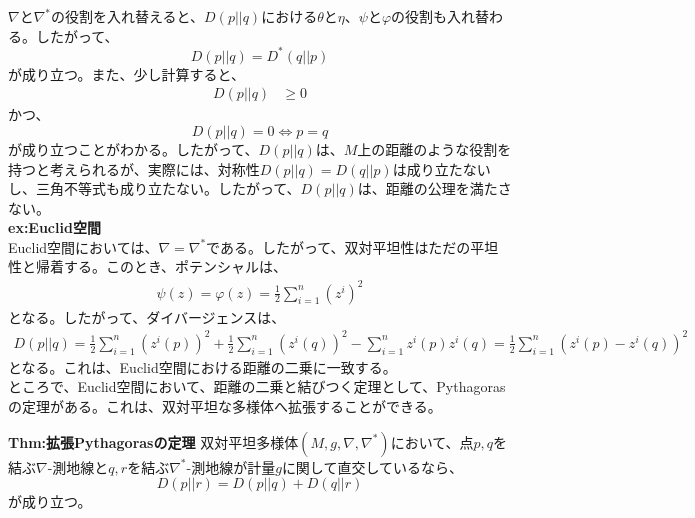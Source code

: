 \documentclass[a4paper,11pt]{jsarticle}
\numberwithin{equation}{section}
\begin{document}
    $\nabla$と$\nabla^*$の役割を入れ替えると、$D(p||q)$における$\theta$と$\eta$、$\psi$と$\varphi$の役割も入れ替わる。したがって、
    \begin{equation}
        D(p||q) = D^*(q||p)
    \end{equation}
    が成り立つ。また、少し計算すると、
    \begin{align}
        D(p||q) 
        &\geq 0
    \end{align}
    かつ、
    \begin{equation}
        D(p||q) = 0 \Leftrightarrow p = q 
    \end{equation}
    が成り立つことがわかる。したがって、$D(p||q)$は、$M$上の距離のような役割を持つと考えられるが、実際には、対称性$D(p||q) = D(q||p)$は成り立たないし、三角不等式も成り立たない。したがって、$D(p||q)$は、距離の公理を満たさない。\\
    
    \textbf{ex:Euclid空間}\\
    Euclid空間においては、$\nabla = \nabla^*$である。したがって、双対平坦性はただの平坦性と帰着する。このとき、ポテンシャルは、
    \begin{align}
        \psi(z) = \varphi(z) = \frac{1}{2}\sum_{i=1}^{n} (z^i)^2
    \end{align}
    となる。したがって、ダイバージェンスは、
    \begin{align}
        D(p||q) = \frac{1}{2}\sum_{i=1}^{n} (z^i(p))^2 + \frac{1}{2}\sum_{i=1}^{n} (z^i(q))^2 - \sum_{i=1}^{n} z^i(p)z^i(q) = \frac{1}{2}\sum_{i=1}^{n} (z^i(p) - z^i(q))^2
    \end{align}
    となる。これは、Euclid空間における距離の二乗に一致する。\\
    ところで、Euclid空間において、距離の二乗と結びつく定理として、Pythagorasの定理がある。これは、双対平坦な多様体へ拡張することができる。
    
    \begin{itembox}[l]{\textbf{Thm:拡張Pythagorasの定理}}
        双対平坦多様体$(M,g,\nabla,\nabla^*)$において、点$p,q$を結ぶ$\nabla$-測地線と$q,r$を結ぶ$\nabla^*$-測地線が計量$g$に関して直交しているなら、
        \begin{equation}
            D(p||r) = D(p||q) + D(q||r)
        \end{equation}
        が成り立つ。
    \end{itembox}
\end{document}
